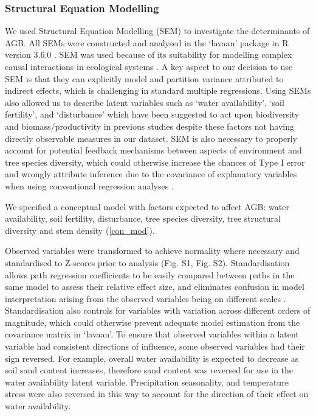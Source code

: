 \documentclass[11pt,a4paper]{article}
\begin{document}
\subsubsection{Structural Equation Modelling}

We used Structural Equation Modelling (SEM) to investigate the determinants of AGB. All SEMs were constructed and analysed in the `lavaan' package \citep{lavaan} in R version 3.6.0 \citep{R2019}. SEM was used because of its suitability for modelling complex causal interactions in ecological systems \citep{Lee2007}. A key aspect to our decision to use SEM is that they can explicitly model and partition variance attributed to indirect effects, which is challenging in standard multiple regressions. Using SEMs also allowed us to describe latent variables such as `water availability', `soil fertility', and `disturbance' which have been suggested to act upon biodiversity and biomass/productivity in previous studies despite these factors not having directly observable measures in our dataset. SEM is also necessary to properly account for potential feedback mechanisms between aspects of environment and tree species diversity, which could otherwise increase the chances of Type I error and wrongly attribute inference due to the covariance of explanatory variables when using conventional regression analyses \citep{Nachtigall2003}.

We specified a conceptual model with factors expected to affect AGB: water availability, soil fertility, disturbance, tree species diversity, tree structural diversity and stem density (\autoref{con_mod}). 

Observed variables were transformed to achieve normality where necessary and standardised to Z-scores prior to analysis (Fig. S1, Fig. S2). Standardisation allows path regression coefficients to be easily compared between paths in the same model to assess their relative effect size, and eliminates confusion in model interpretation arising from the observed variables being on different scales \citep{Beaujean2014}. Standardisation also controls for variables with variation across different orders of magnitude, which could otherwise prevent adequate model estimation from the covariance matrix in `lavaan'. To ensure that observed variables within a latent variable had consistent directions of influence, some observed variables had their sign reversed. For example, overall water availability is expected to decrease as soil sand content increases, therefore sand content was reversed for use in the water availability latent variable. Precipitation seasonality, and temperature stress were also reversed in this way to account for the direction of their effect on water availability. 
\end{document}
